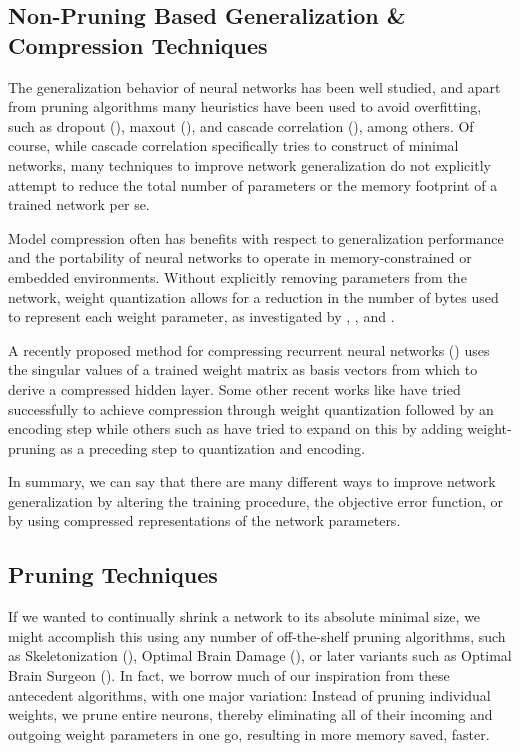 \subsection{Non-Pruning Based Generalization \& Compression Techniques}

The generalization behavior of neural networks has been well studied, and apart from pruning algorithms many heuristics have been used to avoid overfitting, such as dropout (\cite{srivastava2014dropout}), maxout (\cite{goodfellow2013maxout}), and cascade correlation (\cite{fahlman1989cascade}), among others. Of course, while cascade correlation specifically tries to construct of minimal networks, many techniques to improve network generalization do not explicitly attempt to reduce the total number of parameters or the memory footprint of a trained network per se.  

Model compression often has benefits with respect to generalization performance and the portability of neural networks to operate in memory-constrained or embedded environments. Without explicitly removing parameters from the network, weight quantization allows for a reduction in the number of bytes used to represent each weight parameter, as investigated by \cite{balzer1991weight}, \cite{dundar1994effects}, and \cite{hoehfeld1992learning}. 

A recently proposed method for compressing recurrent neural networks (\cite{prabhavalkar2016compression}) uses the singular values of a trained weight matrix as basis vectors from which to derive a compressed hidden layer. Some other recent works like \cite{Anders2016quant} have tried successfully to achieve compression through weight quantization followed by an encoding step while others such as \cite{deepcompression2016} have tried to expand on this by adding weight-pruning as a preceding step to quantization and encoding. 

In summary, we can say that there are many different ways to improve network generalization by altering the training procedure, the objective error function, or by using compressed representations of the network parameters.

\subsection{Pruning Techniques}

If we wanted to continually shrink a network to its absolute minimal size, we might accomplish this using any number of off-the-shelf pruning algorithms, such as Skeletonization (\cite{mozer1989skeletonization}), Optimal Brain Damage (\cite{lecun1989optimal}), or later variants such as Optimal Brain Surgeon (\cite{hassibi1993second}). In fact, we borrow much of our inspiration from these antecedent algorithms, with one major variation: Instead of pruning individual weights, we prune entire neurons, thereby eliminating all of their incoming and outgoing weight parameters in one go, resulting in more memory saved, faster.

